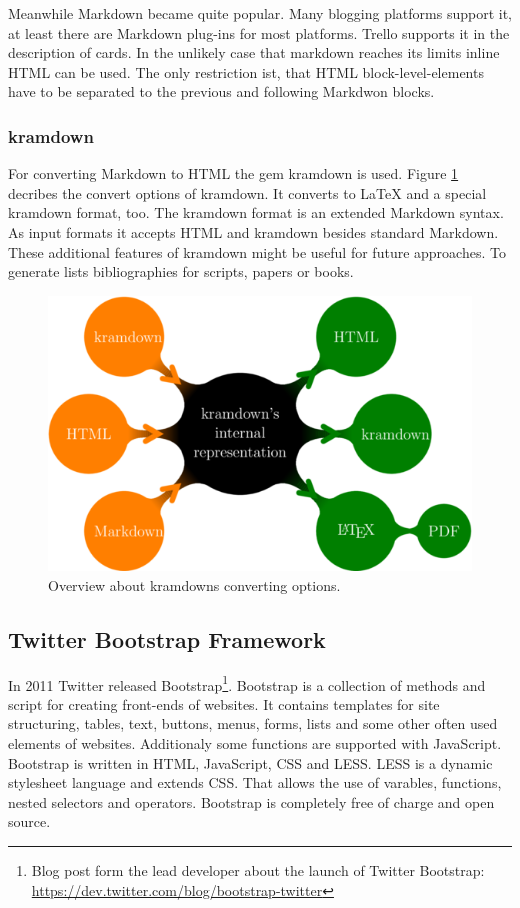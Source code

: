 Meanwhile Markdown became quite popular. Many blogging platforms support it, at least there are Markdown plug-ins for most platforms. Trello supports it in the description of cards. In the unlikely case that markdown reaches its limits inline HTML can be used. The only restriction ist, that HTML block-level-elements have to be separated to the previous and following Markdwon blocks.

\subsubsection{kramdown}

For converting Markdown to HTML the gem kramdown is used. Figure \ref{fig:kramdown} decribes the convert options of kramdown. It converts to LaTeX and a special kramdown format, too. The kramdown format is an extended Markdown syntax. As input formats it accepts HTML and kramdown besides standard Markdown. \cite{kramdown} These additional features of kramdown might be useful for future approaches. To generate lists bibliographies for scripts, papers or books.

\begin{figure}[htb]
\centering
\includegraphics[width=\textwidth]{figures/kramdown}
\caption{Overview about kramdowns converting options. \cite{kramdown}}
\label{fig:kramdown}
\end{figure}

\subsection{Twitter Bootstrap Framework}
In 2011 Twitter released Bootstrap\footnote{Blog post form the lead developer about the launch of Twitter Bootstrap: \url{https://dev.twitter.com/blog/bootstrap-twitter}}. Bootstrap is a collection of methods and script for creating front-ends of websites. It contains templates for site structuring, tables, text, buttons, menus, forms, lists and some other often used elements of websites. Additionaly some functions are supported with JavaScript. Bootstrap is written in HTML, JavaScript, CSS and LESS. LESS is a dynamic stylesheet language and extends CSS. That allows the use of varables, functions, nested selectors and operators.\cite{less} Bootstrap is completely free of charge and open source. \cite{bootstrap}

